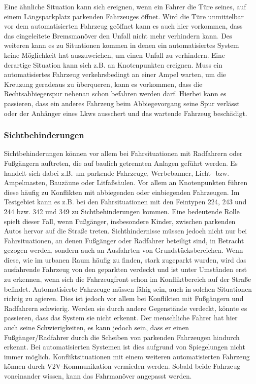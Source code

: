 Eine ähnliche Situation kann sich ereignen, wenn ein Fahrer die Türe seines, auf einem Längsparkplatz parkenden Fahrzeuges öffnet. Wird die Türe unmittelbar vor dem automatisierten Fahrzeug geöffnet kann es auch hier vorkommen, dass das eingeleitete Bremsmanöver den Unfall nicht mehr verhindern kann. Des weiteren kann es zu Situationen kommen in denen ein automatisiertes System keine Möglichkeit hat auszuweichen, um einen Unfall zu verhindern. Eine derartige Situation kann sich z.B. an Knotenpunkten ereignen. Muss ein automatisiertes Fahrzeug verkehrsbedingt an einer Ampel warten, um die Kreuzung geradeaus zu überqueren, kann es vorkommen, dass die Rechtsabbiegerspur nebenan schon befahren werden darf. Hierbei kann es passieren, dass ein anderes Fahrzeug beim Abbiegevorgang seine Spur verlässt oder der Anhänger eines Lkws ausschert und das wartende Fahrzeug beschädigt.

\subsubsection{Sichtbehinderungen}
Sichtbehinderungen können vor allem bei Fahrsituationen mit Radfahrern oder Fußgängern auftreten, die auf baulich getrennten Anlagen geführt werden. Es handelt sich dabei z.B. um parkende Fahrzeuge, Werbebanner, Licht- bzw. Ampelmasten, Bauzäune oder Litfaßsäulen. Vor allem an Knotenpunkten führen diese häufig zu Konflikten mit abbiegenden oder einbiegenden Fahrzeugen. Im Testgebiet kann es z.B. bei den Fahrsituationen mit den Feintypen 224, 243 und 244 bzw. 342 und 349 zu Sichtbehinderungen kommen. Eine bedeutende Rolle spielt dieser Fall, wenn Fußgänger, insbesondere Kinder, zwischen parkenden Autos hervor auf die Straße treten. Sichthindernisse müssen jedoch nicht nur bei Fahrsituationen, an denen Fußgänger oder Radfahrer beteiligt sind, in Betracht gezogen werden, sondern auch an Ausfahrten von Grundstücksbereichen. Wenn diese, wie im urbanen Raum häufig zu finden, stark zugeparkt wurden, wird das ausfahrende Fahrzeug von den geparkten verdeckt und ist unter Umständen erst zu erkennen, wenn sich die Fahrzeugfront schon im Konfliktbereich auf der Straße befindet. Automatisierte Fahrzeuge müssen fähig sein, auch in solchen Situationen richtig zu agieren. Dies ist jedoch vor allem bei Konflikten mit Fußgängern und Radfahrern schwierig. Werden sie durch andere Gegenstände verdeckt, könnte es passieren, dass das System sie nicht erkennt. Der menschliche Fahrer hat hier auch seine Schwierigkeiten, es kann jedoch sein, dass er einen Fußgänger/Radfahrer durch die Scheiben von parkenden Fahrzeugen hindurch erkennt. Bei automatisierten Systemen ist dies aufgrund von Spiegelungen nicht immer möglich. Konfliktsituationen mit einem weiteren automatisierten Fahrzeug können durch \ac{V2V}-Kommunikation vermieden werden. Sobald beide Fahrzeug voneinander wissen, kann das Fahrmanöver angepasst werden.

